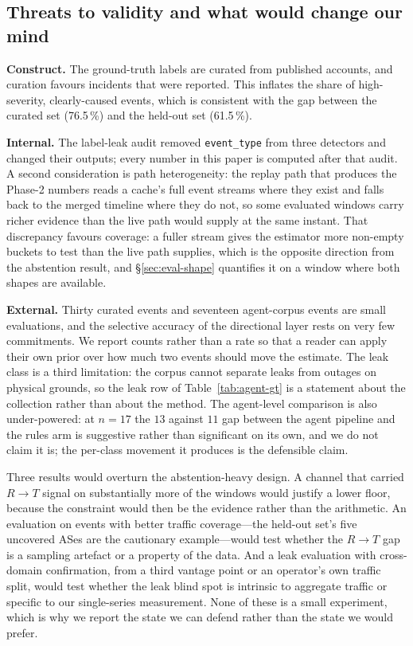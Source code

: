 \subsection{Threats to validity and what would change our mind}

\textbf{Construct.} The ground-truth labels are curated from published
accounts, and curation favours incidents that were reported. This
inflates the share of high-severity, clearly-caused events, which is
consistent with the gap between the curated set (76.5\,\%) and the
held-out set (61.5\,\%).

\textbf{Internal.} The label-leak audit removed \texttt{event\_type}
from three detectors and changed their outputs; every number in this
paper is computed after that audit. A second consideration is path
heterogeneity: the replay path that produces the Phase-2 numbers reads a
cache's full event streams where they exist and falls back to the merged
timeline where they do not, so some evaluated windows carry richer
evidence than the live path would supply at the same instant. That
discrepancy favours coverage: a fuller stream gives the estimator more
non-empty buckets to test than the live path supplies, which is the
opposite direction from the abstention result, and \S\ref{sec:eval-shape}
quantifies it on a window where both shapes are available.

\textbf{External.} Thirty curated events and seventeen agent-corpus
events are small evaluations, and the selective accuracy of the
directional layer rests on very few
commitments. We report counts rather than a rate so that a reader can
apply their own prior over how much two events should move the estimate.
The leak class is a third limitation: the corpus cannot separate leaks
from outages on physical grounds, so the leak row of
Table~\ref{tab:agent-gt} is a statement about the collection rather than
about the method. The agent-level comparison is also under-powered: at
$n=17$ the $13$ against $11$ gap between the agent pipeline and the rules
arm is suggestive rather than significant on its own, and we do not claim
it is; the per-class movement it produces is the defensible claim.

Three results would overturn the abstention-heavy design. A channel that
carried $R\to T$ signal on substantially more of the windows would
justify a lower floor, because the constraint would then be the evidence
rather than the arithmetic. An evaluation on events with better traffic
coverage---the held-out set's five uncovered ASes are the cautionary
example---would test whether the $R\to T$ gap is a sampling artefact or a
property of the data. And a leak evaluation with cross-domain
confirmation, from a third vantage point or an operator's own traffic
split, would test whether the leak blind spot is intrinsic to aggregate
traffic or specific to our single-series measurement. None of these is a
small experiment, which is why we report the state we can defend rather
than the state we would prefer.

